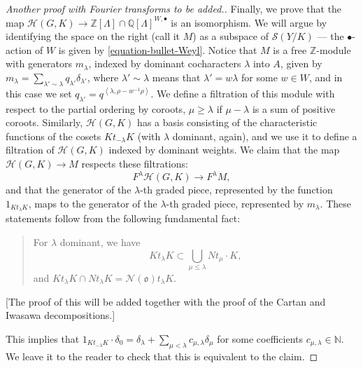 \begin{proof}
 [Another proof with Fourier transforms to be added.]
 
 Finally, we prove that the map $\mathcal H(G,K) \to  \mathbb Z[\Lambda]\cap \mathbb Q[\Lambda]^{W,\bullet}$ is an isomorphism. We will argue by identifying the space on the right (call it $M$) as a subspace of $\mathcal S(Y/K)$ --- the $\bullet$-action of $W$ is given by \eqref{equation-bullet-Weyl}. Notice that $M$ is a free $\mathbb Z$-module with generators $m_\lambda$, indexed by dominant cocharacters $\lambda$ into $A$, given by $m_\lambda= \sum_{\lambda'\sim \lambda} q_{\lambda'} \delta_{\lambda'}$, where $\lambda' \sim \lambda$ means that $\lambda'=w\lambda$ for some $w\in W$, and in this case we set $q_{\lambda'} = q^{\left < \lambda, \rho - w^{-1}\rho\right>}$. We define a filtration of this module with respect to the partial ordering by coroots, $\mu \ge \lambda$ if $\mu-\lambda$ is a sum of positive coroots. Similarly, $\mathcal H(G,K)$ has a basis consisting of the characteristic functions of the cosets $Kt_{-\lambda} K$ (with $\lambda$ dominant, again), and we use it to define a filtration of $\mathcal H(G,K)$ indexed by dominant weights. We claim that the map $\mathcal H(G,K)\to M$ respects these filtrations:
 $$ F^\lambda \mathcal H(G,K)\to F^\lambda M,$$
 and that the generator of the $\lambda$-th graded piece, represented by the function $1_{Kt_\lambda K}$, maps to the generator of the $\lambda$-th graded piece, represented by $m_\lambda$. These statements follow from the following fundamental fact:
 
 \begin{quote}
  For $\lambda$ dominant, we have 
\begin{equation}
\label{equation-Hecke-action-preflag} 
K t_\lambda K \subset \bigcup_{\mu\le \lambda} N t_\mu\cdot K,
\end{equation}
and $K t_\lambda K \cap N t_\lambda K = \mathcal N(\mathfrak o)  t_\lambda  K$. 
 \end{quote}

 [The proof of this will be added together with the proof of the Cartan and Iwasawa decompositions.]
 
This implies that $1_{K t_{-\lambda} K} \cdot \delta_0 = \delta_\lambda + \sum_{\mu<\lambda} c_{\mu,\lambda} \delta_\mu$ for some coefficients $c_{\mu, \lambda}\in\mathbb N$. We leave it to the reader to check that this is equivalent to the claim.
 
\end{proof}


















